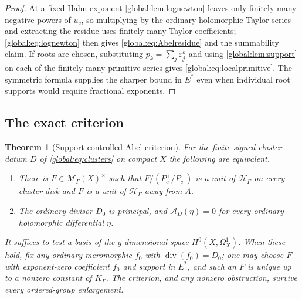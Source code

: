 \documentclass[11pt,letterpaper]{article}
\newtheorem{theorem}{Theorem}[section]
\theoremstyle{definition}
\theoremstyle{remark}
\newcommand{\HH}{\mathscr H_\Gamma}
\newcommand{\KK}{K_\Gamma}
\newcommand{\MG}{\mathscr M_\Gamma}
\numberwithin{equation}{section}
\begin{document}
\begin{proof}
At a fixed Hahn exponent \cref{global:lem:lognewton} leaves only finitely many negative powers of $u_c$, so multiplying by the ordinary holomorphic Taylor series and extracting the residue uses finitely many Taylor coefficients; \eqref{global:eq:lognewton} then gives \eqref{global:eq:Abelresidue} and the summability claim. If roots are chosen, substituting $p_k=\sum_j\varepsilon_j^k$ and using \cref{global:lem:support} on each of the finitely many primitive series gives \eqref{global:eq:localprimitive}. The symmetric formula supplies the sharper bound in $E^*$ even when individual root supports would require fractional exponents.
\end{proof}

\subsection{The exact criterion}

\begin{theorem}[Support-controlled Abel criterion]\label{global:thm:abelcompact}
For the finite signed cluster datum $D$ of \eqref{global:eq:clusters} on compact $X$ the following are equivalent.
\begin{enumerate}[label=\textup{(\roman*)},leftmargin=2.7em]
\item There is $F\in\MG(X)^\times$ such that $F\bigl/(P_c^+/P_c^-)$ is a unit of $\HH$ on every cluster disk and $F$ is a unit of $\HH$ away from $A$.
\item The ordinary divisor $D_0$ is principal, and $\mathcal A_D(\eta)=0$ for every ordinary holomorphic differential $\eta$.
\end{enumerate}
It suffices to test a basis of the $g$-dimensional space $H^0(X,\Omega^1_X)$. When these hold, fix any ordinary meromorphic $f_0$ with $\operatorname{div}(f_0)=D_0$; one may choose $F$ with exponent-zero coefficient $f_0$ and support in $E^*$, and such an $F$ is unique up to a nonzero constant of $\KK$. The criterion, and any nonzero obstruction, survive every ordered-group enlargement.
\end{theorem}
\end{document}

